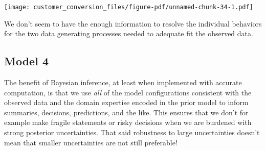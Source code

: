 \documentclass[
  letterpaper,
  DIV=11,
  numbers=noendperiod]{scrartcl}
\newenvironment{Shaded}{\begin{snugshade}}{\end{snugshade}}
\newcommand{\AttributeTok}[1]{\textcolor[rgb]{0.40,0.45,0.13}{#1}}
\newcommand{\DecValTok}[1]{\textcolor[rgb]{0.68,0.00,0.00}{#1}}
\newcommand{\FloatTok}[1]{\textcolor[rgb]{0.68,0.00,0.00}{#1}}
\newcommand{\FunctionTok}[1]{\textcolor[rgb]{0.28,0.35,0.67}{#1}}
\newcommand{\NormalTok}[1]{\textcolor[rgb]{0.00,0.23,0.31}{#1}}
\newcommand{\OtherTok}[1]{\textcolor[rgb]{0.00,0.23,0.31}{#1}}
\newcommand{\SpecialCharTok}[1]{\textcolor[rgb]{0.37,0.37,0.37}{#1}}
\newcommand{\StringTok}[1]{\textcolor[rgb]{0.13,0.47,0.30}{#1}}
\begin{document}
\begin{Shaded}
\end{Shaded}

\texttt{[image: customer\_conversion\_files/figure-pdf/unnamed-chunk-34-1.pdf]}

We don't seem to have the enough information to resolve the individual
behaviors for the two data generating processes needed to adequate fit
the observed data.

\subsection{Model 4}\label{model-4}

The benefit of Bayesian inference, at least when implemented with
accurate computation, is that we use \emph{all} of the model
configurations consistent with the observed data and the domain
expertise encoded in the prior model to inform summaries, decisions,
predictions, and the like. This ensures that we don't for example make
fragile statements or risky decisions when we are burdened with strong
posterior uncertainties. That said robustness to large uncertainties
doesn't mean that smaller uncertainties are not still preferable!
\end{document}
